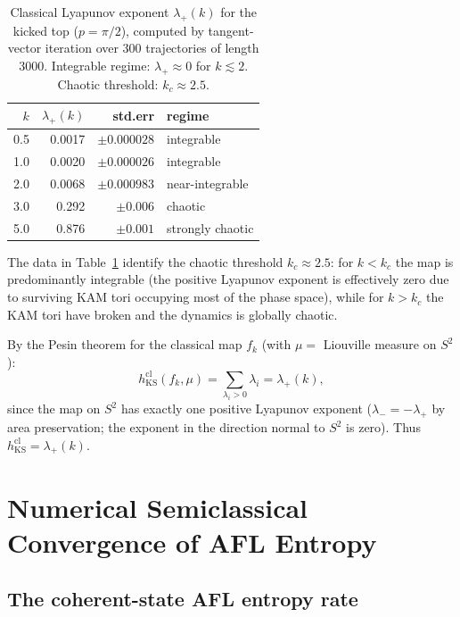 \documentclass[12pt,a4paper]{article}
\begin{document}
\begin{table}[h!]
\centering
\caption{Classical Lyapunov exponent $\lambda_+(k)$ for the kicked top
($p=\pi/2$), computed by tangent-vector iteration over 300 trajectories
of length 3000.  Integrable regime: $\lambda_+ \approx 0$ for $k \lesssim 2$.
Chaotic threshold: $k_c \approx 2.5$.}
\label{tab:lyapunov}
\begin{tabular}{r|rr|l}
\hline
$k$ & $\lambda_+(k)$ & std.err & regime \\
\hline
0.5 & 0.0017 & $\pm0.000028$ & integrable \\
1.0 & 0.0020 & $\pm0.000026$ & integrable \\
2.0 & 0.0068 & $\pm0.000983$ & near-integrable \\
3.0 & 0.292  & $\pm0.006$ & chaotic \\
5.0 & 0.876  & $\pm0.001$ & strongly chaotic \\
\hline
\end{tabular}
\end{table}

The data in Table~\ref{tab:lyapunov} identify the chaotic threshold
$k_c \approx 2.5$: for $k < k_c$ the map is predominantly integrable
(the positive Lyapunov exponent is effectively zero due to surviving KAM
tori occupying most of the phase space), while for $k > k_c$ the KAM
tori have broken and the dynamics is globally chaotic.

By the Pesin theorem for the classical map $f_k$ (with $\mu = $ Liouville
measure on $S^2$):
\[
  h_{\mathrm{KS}}^{\mathrm{cl}}(f_k,\mu)
  = \sum_{\lambda_i > 0}\lambda_i
  = \lambda_+(k),
\]
since the map on $S^2$ has exactly one positive Lyapunov exponent
($\lambda_-= -\lambda_+$ by area preservation; the exponent in the
direction normal to $S^2$ is zero).  Thus $h_{\mathrm{KS}}^{\mathrm{cl}} = \lambda_+(k)$.

\section{Numerical Semiclassical Convergence of AFL Entropy}
\label{sec:cs_convergence}

\subsection{The coherent-state AFL entropy rate}
\end{document}
